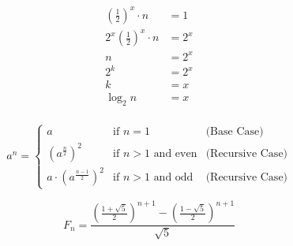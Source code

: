 \documentclass[12pt]{article}
\begin{document}
$$
\begin{aligned}
\left(\frac{1}{2}\right)^x \cdot n &= 1\\
2^x\left(\frac{1}{2}\right)^x \cdot n &= 2^x\\
n &= 2^x\\
2^k &= 2^x\\
k &= x\\
\log_2 n &= x\\
\end{aligned}
$$

$$
a^n =
\left\{\begin{array}{lll}
a & \text{if  $n=1$} & \text{(Base Case)} \\
\left(a^{\frac{n}{2}}\right)^2 & \text{if  $n>1$ and even} & \text{(Recursive Case)} \\
a\cdot \left(a^{\frac{n - 1}{2}}\right)^2 & \text{if  $n>1$ and odd} & \text{(Recursive Case)}
\end{array}\right.
$$

$$
F_n = \frac{\left(\frac{1 + \sqrt{5}}{2}\right)^{n+1}  -  \left(\frac{1 -
\sqrt{5}}{2}\right)^{n+1}}{\sqrt{5}}
$$
\end{document}
